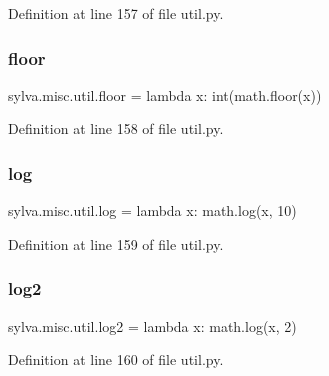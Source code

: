 Definition at line 157 of file util.\+py.

\mbox{\label{namespacesylva_1_1misc_1_1util_aa02f5d131cb4bc9ad1c277a7b0c76885}} 
\subsubsection{\texorpdfstring{floor}{floor}}
{\footnotesize\ttfamily sylva.\+misc.\+util.\+floor = lambda x\+: int(math.\+floor(x))}



Definition at line 158 of file util.\+py.

\mbox{\label{namespacesylva_1_1misc_1_1util_ab3731c524403f8c49cdb518af558d408}} 
\subsubsection{\texorpdfstring{log}{log}}
{\footnotesize\ttfamily sylva.\+misc.\+util.\+log = lambda x\+: math.\+log(x, 10)}



Definition at line 159 of file util.\+py.

\mbox{\label{namespacesylva_1_1misc_1_1util_a6ac1d560ffdd426fb10172ea106318a0}} 
\subsubsection{\texorpdfstring{log2}{log2}}
{\footnotesize\ttfamily sylva.\+misc.\+util.\+log2 = lambda x\+: math.\+log(x, 2)}



Definition at line 160 of file util.\+py.

